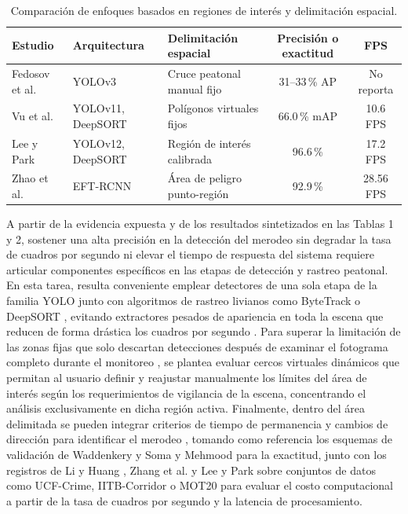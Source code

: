 \documentclass[runningheads]{llncs}
\begin{document}
\begin{table}[!ht]
\centering
\scriptsize
\setlength{\tabcolsep}{5pt}
\renewcommand{\arraystretch}{1.1}
\begin{tabular}{|p{2.2cm}|p{2.3cm}|p{3.0cm}|c|c|}
\hline
{\bfseries Estudio} & {\bfseries Arquitectura} & {\bfseries Delimitación espacial} & {\bfseries Precisión o exactitud} & {\bfseries FPS}\\
\hline
Fedosov et al. \cite{fedosov2021} & YOLOv3 & Cruce peatonal manual fijo & 31--33\,\% AP & No reporta\\
\hline
Vu et al. \cite{vu2026} & YOLOv11, DeepSORT & Polígonos virtuales fijos & 66.0\,\% mAP & 10.6 FPS\\
\hline
Lee y Park \cite{lee2026} & YOLOv12, DeepSORT & Región de interés calibrada & 96.6\,\% & 17.2 FPS\\
\hline
Zhao et al. \cite{zhao2025} & EFT-RCNN & Área de peligro punto-región & 92.9\,\% & 28.56 FPS\\
\hline
\end{tabular}
\vspace{2.5mm}
\caption{Comparación de enfoques basados en regiones de interés y delimitación espacial.}\label{tab2}
\end{table}

A partir de la evidencia expuesta y de los resultados sintetizados en las Tablas 1 y 2, sostener una alta precisión en la detección del merodeo sin degradar la tasa de cuadros por segundo ni elevar el tiempo de respuesta del sistema requiere articular componentes específicos en las etapas de detección y rastreo peatonal. En esta tarea, resulta conveniente emplear detectores de una sola etapa de la familia YOLO junto con algoritmos de rastreo livianos como ByteTrack o DeepSORT \cite{lee2026,li2024,vu2026,zhang2023}, evitando extractores pesados de apariencia en toda la escena que reducen de forma drástica los cuadros por segundo \cite{li2024}. Para superar la limitación de las zonas fijas que solo descartan detecciones después de examinar el fotograma completo durante el monitoreo \cite{lee2026,fedosov2021,vu2026}, se plantea evaluar cercos virtuales dinámicos que permitan al usuario definir y reajustar manualmente los límites del área de interés según los requerimientos de vigilancia de la escena, concentrando el análisis exclusivamente en dicha región activa. Finalmente, dentro del área delimitada se pueden integrar criterios de tiempo de permanencia y cambios de dirección para identificar el merodeo \cite{jiang2022,li2024,m2022,zhang2023}, tomando como referencia los esquemas de validación de Waddenkery y Soma \cite{waddenkery2024} y Mehmood \cite{mehmood2021} para la exactitud, junto con los registros de Li y Huang \cite{li2024}, Zhang et al. \cite{zhang2023} y Lee y Park \cite{lee2026} sobre conjuntos de datos como UCF-Crime, IITB-Corridor o MOT20 para evaluar el costo computacional a partir de la tasa de cuadros por segundo y la latencia de procesamiento.
\end{document}
